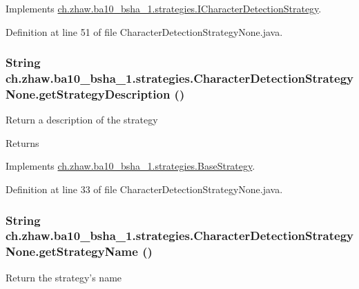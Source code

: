 Implements \hyperlink{interfacech_1_1zhaw_1_1ba10__bsha__1_1_1strategies_1_1ICharacterDetectionStrategy_a994429a274e75c471d18aca69dce2c1d}{ch.zhaw.ba10\_\-bsha\_\-1.strategies.ICharacterDetectionStrategy}.

Definition at line 51 of file CharacterDetectionStrategyNone.java.\hypertarget{classch_1_1zhaw_1_1ba10__bsha__1_1_1strategies_1_1CharacterDetectionStrategyNone_a77ffbdb8eb70ff5517bb8821a2c23572}{
\subsubsection[{getStrategyDescription}]{\setlength{\rightskip}{0pt plus 5cm}String ch.zhaw.ba10\_\-bsha\_\-1.strategies.CharacterDetectionStrategyNone.getStrategyDescription ()}}
\label{classch_1_1zhaw_1_1ba10__bsha__1_1_1strategies_1_1CharacterDetectionStrategyNone_a77ffbdb8eb70ff5517bb8821a2c23572}
Return a description of the strategy

\begin{DoxyReturn}{Returns}

\end{DoxyReturn}


Implements \hyperlink{classch_1_1zhaw_1_1ba10__bsha__1_1_1strategies_1_1BaseStrategy_a75fdb36932ad701f6375cc1fe718056b}{ch.zhaw.ba10\_\-bsha\_\-1.strategies.BaseStrategy}.

Definition at line 33 of file CharacterDetectionStrategyNone.java.\hypertarget{classch_1_1zhaw_1_1ba10__bsha__1_1_1strategies_1_1CharacterDetectionStrategyNone_a9ee9165c5f2511331b3defaa48d35b4c}{
\subsubsection[{getStrategyName}]{\setlength{\rightskip}{0pt plus 5cm}String ch.zhaw.ba10\_\-bsha\_\-1.strategies.CharacterDetectionStrategyNone.getStrategyName ()}}
\label{classch_1_1zhaw_1_1ba10__bsha__1_1_1strategies_1_1CharacterDetectionStrategyNone_a9ee9165c5f2511331b3defaa48d35b4c}
Return the strategy's name

